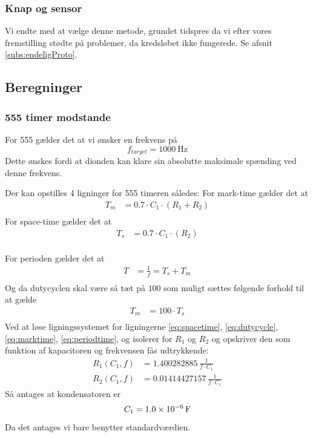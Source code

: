 \subsubsection{Knap og sensor}
Vi endte med at vælge denne metode, grundet tidspres da vi efter vores fremstilling stødte på problemer, da kredsløbet ikke fungerede. Se afsnit \ref{subs:endeligProto}.
\subsection{Beregninger}
\subsubsection{555 timer modstande}
For 555 gælder det at vi ønsker en frekvens på 
\[
	f_{target} =  \SI{1000}{\hertz}
\]
Dette ønskes fordi at dionden kan klare sin absolutte maksimale spænding ved denne frekvens.

Der kan opstilles 4 ligninger for 555 timeren således: 
For mark-time gælder det at
\begin{align}
	T_m &= 0.7 \cdot C_1 \cdot (R_1 + R_2) \label{eq:marktime} \\
\end{align}
For space-time gælder det at 
\begin{align}
	T_s &= 0.7 \cdot C_1 \cdot (R_2) \label{eq:spacetime} \\
\end{align}

For perioden gælder det at 
\begin{align}
	T &= \frac{1}{f} = T_s + T_m \label{eq:periodtime} \\
\end{align}
Og da dutycyclen skal være så tæt på $100$ som muligt sættes følgende forhold til at gælde
\begin{align}
	T_m &= 100 \cdot  T_s \label{eq:dutycycle} \\
\end{align}
Ved at løse ligningssystemet for ligningerne \ref{eq:spacetime}, \ref{eq:dutycycle}, \ref{eq:marktime}, \ref{eq:periodtime}, og isolerer for $R_1$ og $R_2$ og opskriver den som funktion af kapacitoren og frekvensen fås udtrykkende:
\begin{align}
	R_{1} \left( C_1,f \right) &= 1.400282885\,{\frac {1}{f \cdot C_1}} \\[2ex]
	R_{2} \left( C_1,f \right) &= 0.01414427157\,{\frac {1}{f \cdot C_1}}
\end{align}
Så antages at kondensatoren er 
\[
	C_1 = \SI{1.0d-6}{\farad}
\]
Da det antages vi bare benytter standardværdien. 

